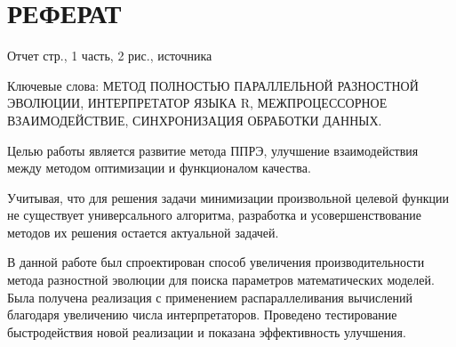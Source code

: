 \chapter*{РЕФЕРАТ}

Отчет \pageref{LastPage} стр., 1 часть, 2 рис.,  источника

Ключевые слова:
МЕТОД ПОЛНОСТЬЮ ПАРАЛЛЕЛЬНОЙ РАЗНОСТНОЙ ЭВОЛЮЦИИ,
ИНТЕРПРЕТАТОР ЯЗЫКА R,
МЕЖПРОЦЕССОРНОЕ ВЗАИМОДЕЙСТВИЕ,
СИНХРОНИЗАЦИЯ ОБРАБОТКИ ДАННЫХ.

Целью работы является развитие
метода ППРЭ,
улучшение взаимодействия между методом оптимизации
и функционалом качества.

Учитывая, что для решения задачи
минимизации произвольной целевой функции
не существует универсального алгоритма,
разработка и усовершенствование
методов их решения остается актуальной задачей.

В данной работе был спроектирован
способ увеличения производительности
метода разностной эволюции
для поиска параметров математических моделей.
Была получена реализация
с применением распараллеливания вычислений
благодаря увеличению числа интерпретаторов.
Проведено тестирование быстродействия
новой реализации и показана эффективность улучшения.


